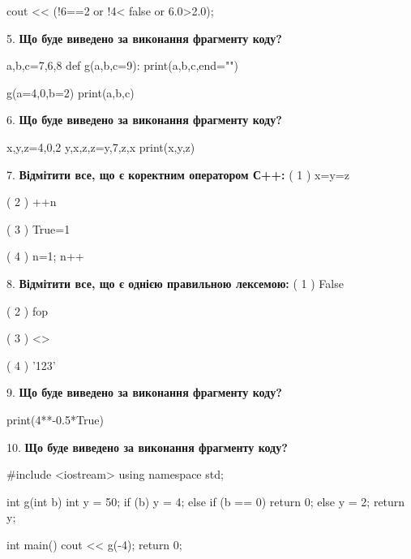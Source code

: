 \documentclass[11pt]{article}
\begin{document}
cout << (!6==2 or !4< false or 6.0>2.0);
\par\vspace{5mm}
5. \textbf{Що буде виведено за виконання фрагменту коду?}

a,b,c=7,6,8
def g(a,b,c=9):
    print(a,b,c,end="")

g(a=4,0,b=2)
print(a,b,c)

\par\vspace{5mm}
6. \textbf{Що буде виведено за виконання фрагменту коду?}

x,y,z=4,0,2
y,x,z,z=y,7,z,x
print(x,y,z)
\par\vspace{5mm}
7. %
\textbf{Відмітити все, що є коректним оператором С++:}
( 1 ) x=y=z

( 2 ) ++n

( 3 ) True=1

( 4 ) n=1; n++
\par\vspace{5mm}
8. %
\textbf{Відмітити все, що є однією правильною лексемою:}
( 1 ) False

( 2 ) fop

( 3 ) <>

( 4 ) '123'
\par\vspace{5mm}
9. \textbf{Що буде виведено за виконання фрагменту коду?}

print(4**-0.5*True)
\par\vspace{5mm}
10. \textbf{Що буде виведено за виконання фрагменту коду?}

#include <iostream>
using namespace std;

int g(int b){
    int y = 50;
    if (b) 
        y = 4;
    else if (b == 0)
         return 0;
    else
         y = 2;
    return y;
}

int main(){
    cout << g(-4);
    return 0;
}

\par\vspace{5mm}
\end{document}
